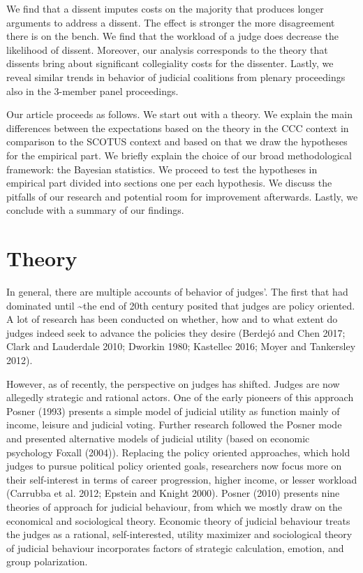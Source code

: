 \documentclass[
  11pt,
]{article}
\begin{document}
We find that a dissent imputes costs on the majority that produces
longer arguments to address a dissent. The effect is stronger the more
disagreement there is on the bench. We find that the workload of a judge
does decrease the likelihood of dissent. Moreover, our analysis
corresponds to the theory that dissents bring about significant
collegiality costs for the dissenter. Lastly, we reveal similar trends
in behavior of judicial coalitions from plenary proceedings also in the
3-member panel proceedings.

Our article proceeds as follows. We start out with a theory. We explain
the main differences between the expectations based on the theory in the
CCC context in comparison to the SCOTUS context and based on that we
draw the hypotheses for the empirical part. We briefly explain the
choice of our broad methodological framework: the Bayesian statistics.
We proceed to test the hypotheses in empirical part divided into
sections one per each hypothesis. We discuss the pitfalls of our
research and potential room for improvement afterwards. Lastly, we
conclude with a summary of our findings.

\hypertarget{theory}{%
\section{Theory}\label{theory}}

In general, there are multiple accounts of behavior of judges'. The
first that had dominated until \textasciitilde the end of 20th century
posited that judges are policy oriented. A lot of research has been
conducted on whether, how and to what extent do judges indeed seek to
advance the policies they desire (Berdejó and Chen 2017; Clark and
Lauderdale 2010; Dworkin 1980; Kastellec 2016; Moyer and Tankersley
2012).

However, as of recently, the perspective on judges has shifted. Judges
are now allegedly strategic and rational actors. One of the early
pioneers of this approach Posner (1993) presents a simple model of
judicial utility as function mainly of income, leisure and judicial
voting. Further research followed the Posner mode and presented
alternative models of judicial utility (based on economic psychology
Foxall (2004)). Replacing the policy oriented approaches, which hold
judges to pursue political policy oriented goals, researchers now focus
more on their self-interest in terms of career progression, higher
income, or lesser workload (Carrubba et al. 2012; Epstein and Knight
2000). Posner (2010) presents nine theories of approach for judicial
behaviour, from which we mostly draw on the economical and sociological
theory. Economic theory of judicial behaviour treats the judges as a
rational, self-interested, utility maximizer and sociological theory of
judicial behaviour incorporates factors of strategic calculation,
emotion, and group polarization.
\end{document}
